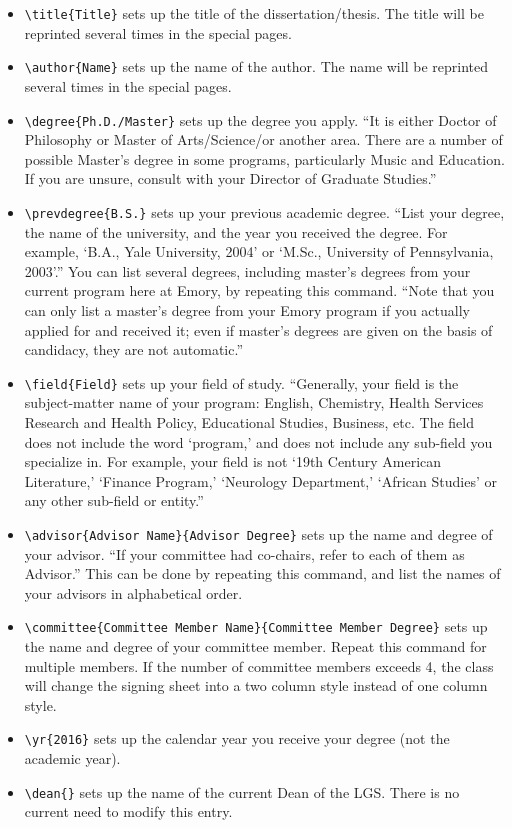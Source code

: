 \documentclass[final]{emory}
\begin{document}
\begin{itemize}
\item \Verb|\title{Title}| sets up the title of the dissertation/thesis. The title 
will be reprinted several times in the special pages.
\item \Verb|\author{Name}| sets up the name of the author. The name will be reprinted
several times in the special pages. 
\item \Verb|\degree{Ph.D./Master}| sets up the degree you apply. ``It is either Doctor
of Philosophy or Master of Arts/Science/or another area.  There are a number of 
possible Master's degree in some programs, particularly Music and Education.  
If you are unsure, consult with your Director of Graduate Studies.'' \autocite{emory-style}
\item \Verb|\prevdegree{B.S.}| sets up your previous academic degree. ``List your 
degree, the name of the university, and the year you received the degree.  
For example, `B.A., Yale University, 2004' or `M.Sc., University of Pennsylvania, 2003'.''
You can list several degrees, including master's degrees from your current 
program here at Emory, by repeating this command.
``Note that you can only list a master's degree from your
Emory program if you actually applied for and received it; even if master's 
degrees are given on the basis of candidacy, they are not automatic.'' \autocite{emory-style} 
\item \Verb|\field{Field}| sets up your field of study. ``Generally, 
your field is the subject-matter name of your program: English, Chemistry, 
Health Services Research and Health Policy, Educational Studies, Business, etc.  
The field does not include the word `program,' and does not include any sub-field
you specialize in.  For example, your field is not `19th Century American Literature,'
`Finance Program,' `Neurology Department,' `African Studies' or any other
sub-field or entity.''\autocite{emory-style}
\item \Verb|\advisor{Advisor Name}{Advisor Degree}| sets up the name and degree of your 
advisor. ``If your committee had co-chairs, refer to each of them as Advisor.'' \autocite{emory-style} 
This can be done by repeating this command, and list the names of your advisors in alphabetical order.
\item \Verb|\committee{Committee Member Name}{Committee Member Degree}| sets 
up\\
the name and degree of your committee member. Repeat this command for multiple 
members. If the number of committee members exceeds 4, the class will change
the signing sheet into a two column style instead of one column style.
\item \Verb|\yr{2016}| sets up the calendar year you receive your degree
(not the academic year).
\item \Verb|\dean{}| sets up the name of the current Dean of the LGS. There is no current need to modify this entry.
\end{itemize}
\end{document}
